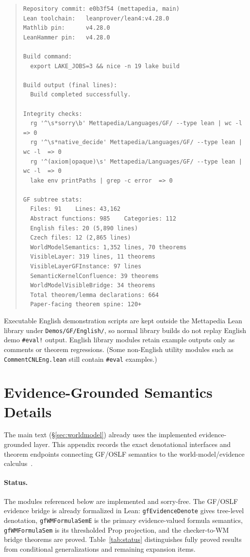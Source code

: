 \documentclass[11pt]{article}
\newcommand{\code}[1]{\texttt{#1}}
\newcommand{\OSLF}{\textup{OSLF}}
\newcommand{\GF}{\textup{GF}}
\begin{document}
\begin{quote}
\small
\begin{verbatim}
Repository commit: e0b3f54 (mettapedia, main)
Lean toolchain:   leanprover/lean4:v4.28.0
Mathlib pin:      v4.28.0
LeanHammer pin:   v4.28.0

Build command:
  export LAKE_JOBS=3 && nice -n 19 lake build

Build output (final lines):
  Build completed successfully.

Integrity checks:
  rg '^\s*sorry\b' Mettapedia/Languages/GF/ --type lean | wc -l  => 0
  rg '^\s*native_decide' Mettapedia/Languages/GF/ --type lean | wc -l  => 0
  rg '^(axiom|opaque)\s' Mettapedia/Languages/GF/ --type lean | wc -l  => 0
  lake env printPaths | grep -c error  => 0

GF subtree stats:
  Files: 91    Lines: 43,162
  Abstract functions: 985    Categories: 112
  English files: 20 (5,890 lines)
  Czech files: 12 (2,865 lines)
  WorldModelSemantics: 1,352 lines, 70 theorems
  VisibleLayer: 319 lines, 11 theorems
  VisibleLayerGFInstance: 97 lines
  SemanticKernelConfluence: 39 theorems
  WorldModelVisibleBridge: 34 theorems
  Total theorem/lemma declarations: 664
  Paper-facing theorem spine: 120+
\end{verbatim}
\end{quote}

\noindent
Executable English demonstration scripts are kept outside the
Mettapedia Lean library under \code{Demos/GF/English/}, so normal
library builds do not replay English demo \code{\#eval!} output.
English library modules retain example outputs only as comments or
theorem regressions.  (Some non-English utility modules such as
\code{CommentCNLEng.lean} still contain \code{\#eval} examples.)

\section{Evidence-Grounded Semantics Details}
\label{app:evidence}
\label{sec:evidence}

The main text (\S\ref{sec:worldmodel}) already uses the implemented
evidence-grounded layer.  This appendix records the exact denotational
interfaces and theorem endpoints connecting \GF{}/\OSLF{} semantics to the
world-model/evidence calculus~\cite{goertzel2009pln}.

\paragraph{Status.}  The modules referenced below are implemented and
sorry-free.  The \GF{}/\OSLF{} evidence bridge is already formalized in Lean:
\code{gfEvidenceDenote} gives tree-level denotation,
\code{gfWMFormulaSemE} is the primary evidence-valued formula semantics,
\code{gfWMFormulaSem} is its thresholded Prop projection, and the checker-to-WM
bridge theorems are proved.  Table~\ref{tab:status} distinguishes fully proved
results from conditional generalizations and remaining expansion items.
\end{document}
